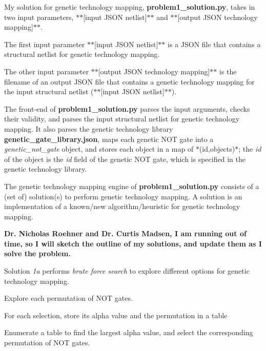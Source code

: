 My solution for genetic technology mapping, {\bfseries problem1\+\_\+solution.\+py}, takes in two input parameters, $\ast$$\ast$\mbox{[}input J\+S\+O\+N netlist\mbox{]}$\ast$$\ast$ and $\ast$$\ast$\mbox{[}output J\+S\+O\+N technology mapping\mbox{]}$\ast$$\ast$.

The first input parameter $\ast$$\ast$\mbox{[}input J\+S\+O\+N netlist\mbox{]}$\ast$$\ast$ is a J\+S\+O\+N file that contains a structural netlist for genetic technology mapping.

The other input parameter $\ast$$\ast$\mbox{[}output J\+S\+O\+N technology mapping\mbox{]}$\ast$$\ast$ is the filename of an output J\+S\+O\+N file that contains a genetic technology mapping for the input structural netlist ($\ast$$\ast$\mbox{[}input J\+S\+O\+N netlist\mbox{]}$\ast$$\ast$).

The front-\/end of {\bfseries problem1\+\_\+solution.\+py} parses the input arguments, checks their validity, and parses the input structural netlist for genetic technology mapping. It also parses the genetic technology library {\bfseries genetic\+\_\+gate\+\_\+library.\+json}, maps each genetic N\+O\+T gate into a {\itshape genetic\+\_\+not\+\_\+gate} object, and stores each object in a map of $\ast$(id,objects)$\ast$; the {\itshape id} of the object is the {\itshape id} field of the genetic N\+O\+T gate, which is specified in the genetic technology library.

The genetic technology mapping engine of {\bfseries problem1\+\_\+solution.\+py} consists of a (set of) solution(s) to perform genetic technology mapping. A solution is an implementation of a known/new algorithm/heuristic for genetic technology mapping.

{\bfseries Dr. Nicholas Roehner and Dr. Curtis Madsen, I am running out of time, so I will sketch the outline of my solutions, and update them as I solve the problem.}

Solution {\itshape 1a} performs {\itshape brute force search} to explore different options for genetic technology mapping.
\begin{DoxyItemize}
\item Explore each permutation of N\+O\+T gates.
\item For each selection, store its alpha value and the permutation in a table
\item Enumerate a table to find the largest alpha value, and select the corresponding permutation of N\+O\+T gates.
\end{DoxyItemize}

